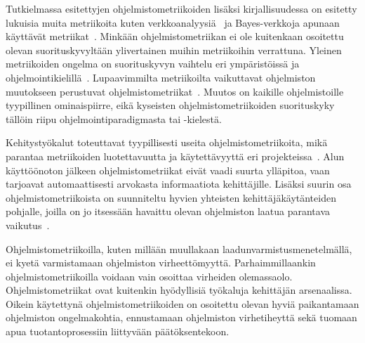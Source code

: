 \documentclass[finnish]{tktltiki2}
\theoremstyle{definition}
\theoremstyle{remark}
\begin{document}
Tutkielmassa esitettyjen ohjelmistometriikoiden lisäksi kirjallisuudessa on esitetty lukuisia muita metriikoita kuten verkkoanalyysiä~\cite{ZN08} ja Bayes-verkkoja apunaan käyttävät metriikat~\cite{FNMHMKM07}. Minkään ohjelmistometriikan ei ole kuitenkaan osoitettu olevan suorituskyvyltään ylivertainen muihin metriikoihin verrattuna. Yleinen metriikoiden ongelma on suorituskyvyn vaihtelu eri ympäristöissä ja ohjelmointikielillä~\cite{FM00}. Lupaavimmilta metriikoilta vaikuttavat ohjelmiston muutokseen perustuvat ohjelmistometriikat~\cite{HH05, KZWZ07, RPHBD11}. Muutos on kaikille ohjelmistoille tyypillinen ominaispiirre, eikä kyseisten ohjelmistometriikoiden suorituskyky tällöin riipu ohjelmointiparadigmasta tai -kielestä.

Kehitystyökalut toteuttavat tyypillisesti useita ohjelmistometriikoita, mikä parantaa metriikoiden luotettavuutta ja käytettävyyttä eri projekteissa~\cite{LLL08}. Alun käyttöönoton jälkeen ohjelmistometriikat eivät vaadi suurta ylläpitoa, vaan tarjoavat automaattisesti arvokasta informaatiota kehittäjille. Lisäksi suurin osa ohjelmistometriikoista on suunniteltu hyvien yhteisten kehittäjäkäytänteiden pohjalle, joilla on jo itsessään havaittu olevan ohjelmiston laatua parantava vaikutus~\cite{SS10}.

Ohjelmistometriikoilla, kuten millään muullakaan laadunvarmistusmenetelmällä, ei kyetä varmistamaan ohjelmiston virheettömyyttä. Parhaimmillaankin ohjelmistometriikoilla voidaan vain osoittaa virheiden olemassaolo. Ohjelmistometriikat ovat kuitenkin hyödyllisiä työkaluja kehittäjän arsenaalissa. Oikein käytettynä ohjelmistometriikoiden on osoitettu olevan hyviä paikantamaan ohjelmiston ongelmakohtia, ennustamaan ohjelmiston virhetiheyttä sekä tuomaan apua tuotantoprosessiin liittyvään päätöksentekoon.

%
%
% 
%
\newpage







%
\end{document}
